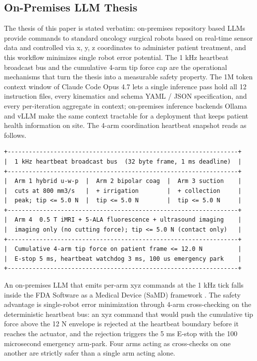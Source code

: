 \subsection{On-Premises LLM Thesis}
\label{sec:intro-thesis}

The thesis of this paper is stated verbatim: on-premises repository
based LLMs provide commands to standard oncology surgical robots
based on real-time sensor data and controlled via x, y, z coordinates
to administer patient treatment, and this workflow minimizes single
robot error potential. The 1 kHz heartbeat broadcast bus and the
cumulative 4-arm tip force cap are the operational mechanisms that
turn the thesis into a measurable safety property. The 1M token
context window of Claude Code Opus 4.7 \cite{claude-opus-47,
claude-code} lets a single inference pass hold all 12 instruction
files, every kinematics and schema YAML / JSON specification, and
every per-iteration aggregate in context; on-premises inference
backends Ollama \cite{ollama} and vLLM \cite{vllm} make the same
context tractable for a deployment that keeps patient health
information on site. The 4-arm coordination heartbeat snapshot reads
as follows.

\begin{verbatim}
+-----------------------------------------------------------------+
|  1 kHz heartbeat broadcast bus  (32 byte frame, 1 ms deadline)  |
+-----------------------------------------------------------------+
|  Arm 1 hybrid u-w-p  |  Arm 2 bipolar coag  |  Arm 3 suction    |
|  cuts at 800 mm3/s   |  + irrigation        |  + collection     |
|  peak; tip <= 5.0 N  |  tip <= 5.0 N        |  tip <= 5.0 N     |
+-----------------------------------------------------------------+
|  Arm 4  0.5 T iMRI + 5-ALA fluorescence + ultrasound imaging    |
|  imaging only (no cutting force); tip <= 5.0 N (contact only)   |
+-----------------------------------------------------------------+
|  Cumulative 4-arm tip force on patient frame <= 12.0 N          |
|  E-stop 5 ms, heartbeat watchdog 3 ms, 100 us emergency park    |
+-----------------------------------------------------------------+
\end{verbatim}

An on-premises LLM that emits per-arm xyz commands at the 1 kHz tick
falls inside the FDA Software as a Medical Device (SaMD) framework
\cite{fda-samd}. The safety advantage is single-robot error
minimization through 4-arm cross-checking on the deterministic
heartbeat bus: an xyz command that would push the cumulative tip
force above the 12 N envelope is rejected at the heartbeat boundary
before it reaches the actuator, and the rejection triggers the 5 ms
E-stop with the 100 microsecond emergency arm-park. Four arms acting
as cross-checks on one another are strictly safer than a single arm
acting alone.

